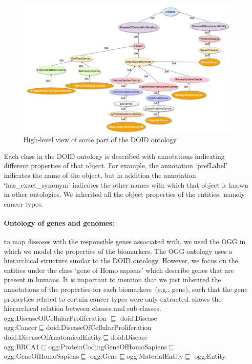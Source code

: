 \vspace{-4mm}

\begin{figure}
	\centering
	\includegraphics[width=0.75\linewidth,height=70mm]{images/do.png}
	\caption{High-level view of some part of the DOID ontology} 
	\label{fig:oncoontology14}
	\vspace{-2mm}
\end{figure}

\hspace*{3.5mm} Each class in the DOID ontology is described with annotations indicating different properties of that object. For example, the annotation `prefLabel' indicates the name of the object, but in addition the annotation `has\_exact\_synonym' indicates the other names with which that object is known in other ontologies. We inherited all the object properties of the entities, namely cancer types.

\paragraph{Ontology of genes and genomes:} \hspace*{-2.5mm} to map diseases with the responsible genes associated with, we used the OGG in which we model the properties of the biomarkers. The OGG ontology uses a hierarchical structure similar to the DOID ontology. However, we focus on the entities under the class `gene of Homo sapiens' which describe genes that are present in humans. It is important to mention that we just inherited the annotations of the properties for each biomarkers~(e.g., gene), such that the gene properties related to certain cancer types were only extracted.  shows the hierarchical relation between classes and sub-classes.\\

\vspace{-4mm}
{\scriptsize \noindent ogg:DiseaseOfCellularProliferation $\sqsubseteq$ doid:Disease\\
ogg:Cancer$\sqsubseteq$doid:DiseaseOfCellularProliferation\\
doid:DiseaseOfAnatomicalEntity$\sqsubseteq$doid:Disease\\
ogg:BRCA1$\sqsubseteq$ogg:ProteinCodingGeneOfHomoSapiens$\sqsubseteq$ogg:GeneOfHomoSapiens$\sqsubseteq$ ogg:Gene$\sqsubseteq$ogg:MaterialEntity$\sqsubseteq$ ogg:Entity.}\\

